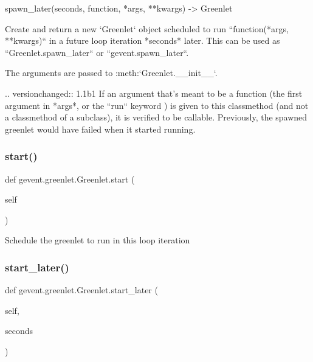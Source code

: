 \begin{DoxyVerb}spawn_later(seconds, function, *args, **kwargs) -> Greenlet

Create and return a new `Greenlet` object scheduled to run ``function(*args, **kwargs)``
in a future loop iteration *seconds* later. This can be used as ``Greenlet.spawn_later``
or ``gevent.spawn_later``.

The arguments are passed to :meth:`Greenlet.__init__`.

.. versionchanged:: 1.1b1
   If an argument that's meant to be a function (the first argument in *args*, or the ``run`` keyword )
   is given to this classmethod (and not a classmethod of a subclass),
   it is verified to be callable. Previously, the spawned greenlet would have failed
   when it started running.
\end{DoxyVerb}
 \mbox{\label{classgevent_1_1greenlet_1_1_greenlet_abb02125e97e92a471b607c93a77a4913}} 
\subsubsection{\texorpdfstring{start()}{start()}}
{\footnotesize\ttfamily def gevent.\+greenlet.\+Greenlet.\+start (\begin{DoxyParamCaption}\item[{}]{self }\end{DoxyParamCaption})}

\begin{DoxyVerb}Schedule the greenlet to run in this loop iteration\end{DoxyVerb}
 \mbox{\label{classgevent_1_1greenlet_1_1_greenlet_a9b2d04850d4da344f6205f5e63b90a0c}} 
\subsubsection{\texorpdfstring{start\+\_\+later()}{start\_later()}}
{\footnotesize\ttfamily def gevent.\+greenlet.\+Greenlet.\+start\+\_\+later (\begin{DoxyParamCaption}\item[{}]{self,  }\item[{}]{seconds }\end{DoxyParamCaption})}

